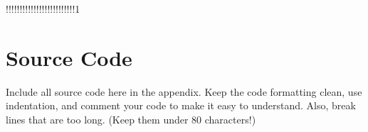 !!!!!!!!!!!!!!!!!!!!!!!!!1

\newpage

\appendix

\section{Source Code}

Include all source code here in the appendix. Keep the code formatting clean,
use indentation, and comment your code to make it easy to understand. Also,
break lines that are too long. (Keep them under 80 characters!)

%

%


% 

% 

% 

% 

